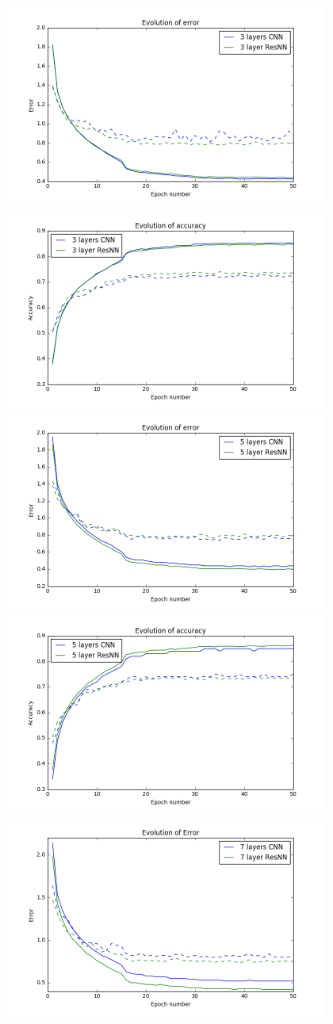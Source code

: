 \documentclass[]{article}
\begin{document}
\begin{figure}[!h]
\begin{center}
\includegraphics[width = 3.3in]{res_3layers_err}
\includegraphics[width = 3.3in]{res_3layers_acc}
\includegraphics[width = 3.3in]{res_5layers_err}
\includegraphics[width = 3.3in]{res_5layers_acc}
\includegraphics[width = 3.3in]{res_7layers_err}

\end{center}
\end{figure}
\end{document}
